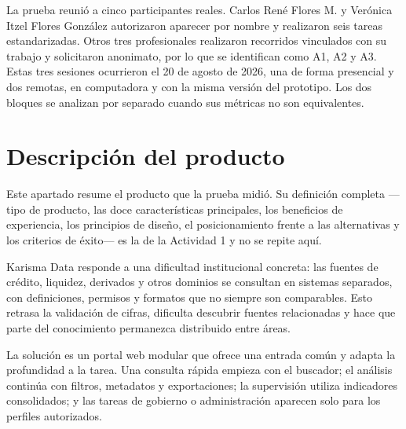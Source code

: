 \begin{uxnota}
La prueba reunió a cinco participantes reales. Carlos René Flores M. y Verónica Itzel Flores
González autorizaron aparecer por nombre y realizaron seis tareas estandarizadas. Otros tres
profesionales realizaron recorridos vinculados con su trabajo y solicitaron anonimato, por lo que
se identifican como A1, A2 y A3. Estas tres sesiones ocurrieron el 20 de agosto de 2026, una de
forma presencial y dos remotas, en computadora y con la misma versión del prototipo. Los dos
bloques se analizan por separado cuando sus métricas no son equivalentes.
\end{uxnota}

\section{Descripción del producto}\label{sec:a5-producto}

Este apartado resume el producto que la prueba midió. Su definición completa ---tipo de producto,
las doce características principales, los beneficios de experiencia, los principios de diseño, el
posicionamiento frente a las alternativas y los criterios de éxito--- es la de la Actividad 1 y no
se repite aquí.

Karisma Data responde a una dificultad institucional concreta: las fuentes de crédito, liquidez,
derivados y otros dominios se consultan en sistemas separados, con definiciones, permisos y
formatos que no siempre son comparables. Esto retrasa la validación de cifras, dificulta descubrir
fuentes relacionadas y hace que parte del conocimiento permanezca distribuido entre áreas.

La solución es un portal web modular que ofrece una entrada común y adapta la profundidad a la
tarea. Una consulta rápida empieza con el buscador; el análisis continúa con filtros, metadatos y
exportaciones; la supervisión utiliza indicadores consolidados; y las tareas de gobierno o
administración aparecen solo para los perfiles autorizados.

